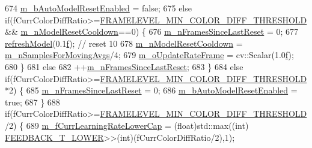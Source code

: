 \begin{DoxyCode}
674                 \mbox{\hyperlink{class_background_subtractor_l_b_s_p_a9d260f4e42e3fc79fb21af950ca9087a}{m\_bAutoModelResetEnabled}} = \textcolor{keyword}{false};
675             \textcolor{keywordflow}{else} \textcolor{keywordflow}{if}(fCurrColorDiffRatio>=\mbox{\hyperlink{_background_subtractor_su_b_s_e_n_s_e_8cpp_a0cb380c0500e4a688b9b1b794c29de01}{FRAMELEVEL\_MIN\_COLOR\_DIFF\_THRESHOLD}}
       && \mbox{\hyperlink{class_background_subtractor_l_b_s_p_a5ea18d388afacf8285c46ba0f754e7ee}{m\_nModelResetCooldown}}==0) \{
676                 \mbox{\hyperlink{class_background_subtractor_l_b_s_p_ab56bf775dfdf0579e834e45210c3a92a}{m\_nFramesSinceLastReset}} = 0;
677                 \mbox{\hyperlink{class_background_subtractor_su_b_s_e_n_s_e_abe80bf042f2b7a1f72942460d74b1f02}{refreshModel}}(0.1\mbox{\hyperlink{rings_8cpp_a77369fc4d5326a16d2c603e032023528}{f}}); \textcolor{comment}{// reset 10%
678                 \mbox{\hyperlink{class_background_subtractor_l_b_s_p_a5ea18d388afacf8285c46ba0f754e7ee}{m\_nModelResetCooldown}} = 
      \mbox{\hyperlink{class_background_subtractor_su_b_s_e_n_s_e_acd112ccb067f76e370400565fa09ee49}{m\_nSamplesForMovingAvgs}}/4;
679                 \mbox{\hyperlink{class_background_subtractor_su_b_s_e_n_s_e_a90cb2cc5cbe3f2f0b01e06f514c8b569}{m\_oUpdateRateFrame}} = cv::Scalar(1.0\mbox{\hyperlink{rings_8cpp_a77369fc4d5326a16d2c603e032023528}{f}});
680             \}
681             \textcolor{keywordflow}{else}
682                 ++\mbox{\hyperlink{class_background_subtractor_l_b_s_p_ab56bf775dfdf0579e834e45210c3a92a}{m\_nFramesSinceLastReset}};
683         \}
684         \textcolor{keywordflow}{else} \textcolor{keywordflow}{if}(fCurrColorDiffRatio>=\mbox{\hyperlink{_background_subtractor_su_b_s_e_n_s_e_8cpp_a0cb380c0500e4a688b9b1b794c29de01}{FRAMELEVEL\_MIN\_COLOR\_DIFF\_THRESHOLD}}
      *2) \{
685             \mbox{\hyperlink{class_background_subtractor_l_b_s_p_ab56bf775dfdf0579e834e45210c3a92a}{m\_nFramesSinceLastReset}} = 0;
686             \mbox{\hyperlink{class_background_subtractor_l_b_s_p_a9d260f4e42e3fc79fb21af950ca9087a}{m\_bAutoModelResetEnabled}} = \textcolor{keyword}{true};
687         \}
688         \textcolor{keywordflow}{if}(fCurrColorDiffRatio>=\mbox{\hyperlink{_background_subtractor_su_b_s_e_n_s_e_8cpp_a0cb380c0500e4a688b9b1b794c29de01}{FRAMELEVEL\_MIN\_COLOR\_DIFF\_THRESHOLD}}/2) \{
689             \mbox{\hyperlink{class_background_subtractor_su_b_s_e_n_s_e_a57fdd29e43afc163233e55f9a7cd9f37}{m\_fCurrLearningRateLowerCap}} = (float)std::max((\textcolor{keywordtype}{int})
      \mbox{\hyperlink{_background_subtractor_su_b_s_e_n_s_e_8cpp_a6975332215c62c3172a76af852bc5566}{FEEDBACK\_T\_LOWER}}>>(int)(fCurrColorDiffRatio/2),1);
}
\end{DoxyCode}
